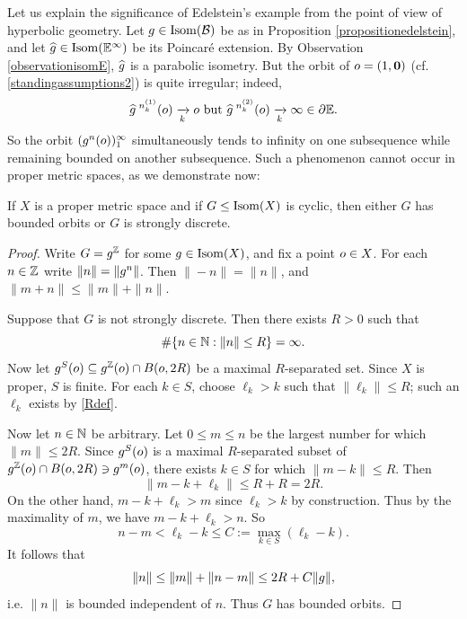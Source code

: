 \begin{remark}
\label{remarkedelsteinsignificance}
Let us explain the significance of Edelstein's example from the point of view of hyperbolic geometry. Let $g\in\operatorname{Isom}(\mathcal B)$ be as in Proposition \ref{propositionedelstein}, and let $\what g\in \Isom(\E^\infty)$ be its Poincar\'e extension. By Observation \ref{observationisomE}, $\widehat g$ is a parabolic isometry. But the orbit of $o = (1,\mathbf 0)$ (cf. \6\ref{standingassumptions2}) is quite irregular; indeed,
\[
\what g^{\;n_{k}^{(1)}}(\zero) \tendsto k \zero \text{ but } \what g^{\;n_{k}^{(2)}}(\zero) \tendsto k \infty\in\del\E.
\]
So the orbit $(g^n(o))_1^\infty$ simultaneously tends to infinity on one subsequence while remaining bounded on another subsequence. Such a phenomenon cannot occur in proper metric spaces, as we demonstrate now:
\end{remark}
\begin{theorem}
If $X$ is a proper metric space and if $G\leq\operatorname{Isom}(X)$ is cyclic, then either $G$ has bounded orbits or $G$ is strongly discrete.
\end{theorem}
\begin{proof}
Write $G = g^\Z$ for some $g\in\operatorname{Isom}(X)$, and fix a point $o\in X$. For each $n\in\Z$ write $\|n\| = \|g^n\|$. Then $\|-n\| = \|n\|$, and $\|m + n\| \leq \|m\| + \|n\|$.

Suppose that $G$ is not strongly discrete. Then there exists $R > 0$ such that
\begin{equation}
\label{Rdef}
\#\{n\in\N : \|n\| \leq R\} = \infty.
\end{equation}
Now let $g^S(\zero) \subset g^\Z(\zero)\cap B(\zero,2R)$ be a maximal $R$-separated set. Since $X$ is proper, $S$ is finite. For each $k\in S$, choose $\ell_k > k$ such that $\|\ell_k\| \leq R$; such an $\ell_k$ exists by \eqref{Rdef}.

Now let $n\in\N$ be arbitrary. Let $0\leq m \leq n$ be the largest number for which $\|m\| \leq 2R$. Since $g^S(o)$ is a maximal $R$-separated subset of $g^\Z(\zero)\cap B(\zero,2R)\ni g^m(\zero)$, there exists $k\in S$ for which $\|m - k\| \leq R$. Then
\[
\|m - k + \ell_k\| \leq R + R = 2R.
\]
On the other hand, $m - k + \ell_k > m$ since $\ell_k > k$ by construction. Thus by the maximality of $m$, we have $m - k + \ell_k > n$. So
\[
n - m < \ell_k - k \leq C := \max_{k\in S} (\ell_k - k).
\]
It follows that
\[
\|n\| \leq \|m\| + \|n - m\| \leq 2R + C\|g\|,
\]
i.e. $\|n\|$ is bounded independent of $n$. Thus $G$ has bounded orbits.
\end{proof}

